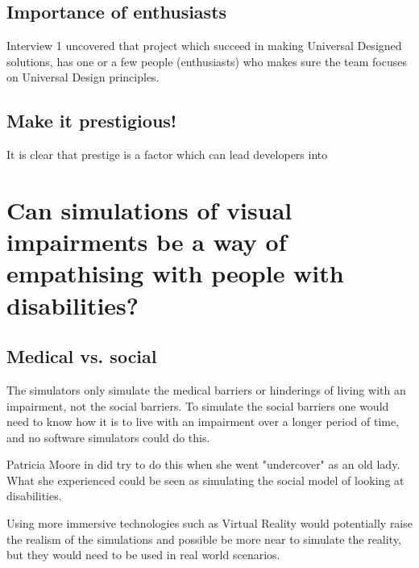 \subsection{Importance of enthusiasts}
Interview 1 uncovered that project which succeed in making Universal Designed solutions, has one or a few people (enthusiasts) who makes sure the team focuses on Universal Design principles. 

\subsection{Make it prestigious!}
It is clear that prestige is a factor which can lead developers into 

\section{Can simulations of visual impairments be a way of empathising with people with disabilities?}
\subsection{Medical vs. social}
The simulators only simulate the medical barriers or hinderings of living with an impairment, not the social barriers. To simulate the social barriers one would need to know how it is to live with an impairment over a longer period of time, and no software simulators could do this. 

Patricia Moore in \textcite{coleman_design_2007} did try to do this when she went "undercover" as an old lady. What she experienced could be seen as simulating the social model of looking at disabilities. 

Using more immersive technologies such as Virtual Reality would potentially raise the realism of the simulations and possible be more near to simulate the reality, but they would need to be used in real world scenarios.

    




